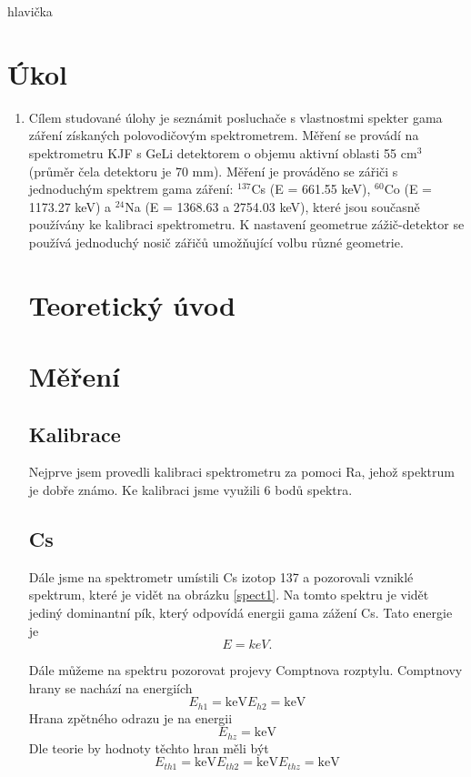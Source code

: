 hlavička

\section{Úkol}
\begin{enumerate}
    \item Cílem studované úlohy je seznámit posluchače s vlastnostmi spekter gama záření získaných polovodičovým spektrometrem.
    Měření se provádí na spektrometru KJF s GeLi detektorem o objemu aktivní oblasti 55 cm$^3$ (průměr čela detektoru je 70 mm). 
    Měření je prováděno se zářiči s jednoduchým spektrem gama záření: $^137$Cs (E = 661.55 keV), $^60$Co (E = 1173.27 keV) a 
    $^24$Na (E = 1368.63 a 2754.03 keV), které jsou současně používány ke kalibraci spektrometru. K nastavení geometrue zážič-detektor 
    se používá jednoduchý nosič zářičů umožňující volbu různé geometrie.

\section{Teoretický úvod}

\section{Měření}
\subsection{Kalibrace}
Nejprve jsem provedli kalibraci spektrometru za pomoci Ra, jehož spektrum je dobře známo.
Ke kalibraci jsme využili 6 bodů spektra.

\subsection{Cs}
Dále jsme na spektrometr umístili Cs izotop 137 a pozorovali vzniklé spektrum, které je vidět na obrázku \ref{spect1}. 
Na tomto spektru je vidět jediný dominantní pík, který odpovídá energii gama zážení Cs. Tato energie je 
$$
E=  {keV}.
$$

Dále můžeme na spektru pozorovat projevy Comptnova rozptylu. Comptnovy hrany se nachází na energiích
$$
E_{h1}= \mbox{keV}
E_{h2}= \mbox{keV}
$$
Hrana zpětného odrazu je na energii
$$
E_{hz}= \mbox{keV}
$$
Dle teorie by hodnoty těchto hran měli být
$$
E_{th1}= \mbox{keV}
E_{th2}= \mbox{keV}
E_{thz}= \mbox{keV}
$$


\end{enumerate}
